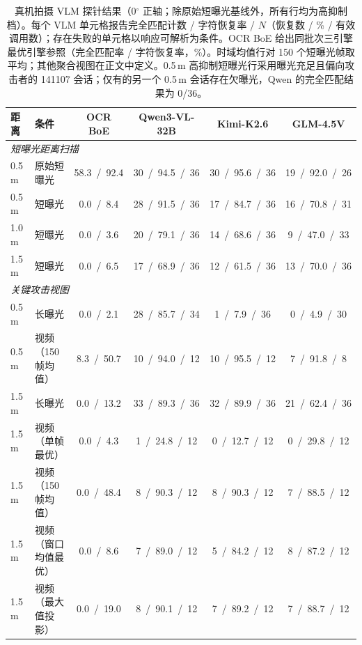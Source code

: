 \documentclass{ieeeaccess}
\begin{document}
\begin{table}[!t]
\caption{真机拍摄 VLM 探针结果（0$^{\circ}$ 正轴；除原始短曝光基线外，所有行均为高抑制档）。每个 VLM 单元格报告完全匹配计数 / 字符恢复率 / $N$（恢复数 / \% / 有效调用数）；存在失败的单元格以响应可解析为条件。OCR BoE 给出同批次三引擎最优引擎参照（完全匹配率 / 字符恢复率，\%）。时域均值行对 150 个短曝光帧取平均；其他聚合视图在正文中定义。0.5\,m 高抑制短曝光行采用曝光充足且偏向攻击者的 141107 会话；仅有的另一个 0.5\,m 会话存在欠曝光，Qwen 的完全匹配结果为 0/36。}
\label{tab:real_vlm}
\centering
\footnotesize
\setlength{\tabcolsep}{4.2pt}
\begin{tabular}{llcccc}
\toprule
距离 & 条件 & OCR BoE & Qwen3-VL-32B & Kimi-K2.6 & GLM-4.5V \\
\midrule
\multicolumn{6}{l}{\textit{短曝光距离扫描}}\\
\midrule
0.5\,m & 原始短曝光 & 58.3~/~92.4 & 30~/~94.5~/~36 & 30~/~95.6~/~36 & 19~/~92.0~/~26 \\
0.5\,m & 短曝光 & 0.0~/~8.4 & 28~/~91.5~/~36 & 17~/~84.7~/~36 & 16~/~70.8~/~31 \\
1.0\,m & 短曝光 & 0.0~/~3.6 & 20~/~79.1~/~36 & 14~/~68.6~/~36 & 9~/~47.0~/~33 \\
1.5\,m & 短曝光 & 0.0~/~6.5 & 17~/~68.9~/~36 & 12~/~61.5~/~36 & 13~/~70.0~/~36 \\
\midrule
\multicolumn{6}{l}{\textit{关键攻击视图}}\\
\midrule
0.5\,m & 长曝光 & 0.0~/~2.1 & 28~/~85.7~/~34 & 1~/~7.9~/~36 & 0~/~4.9~/~30 \\
0.5\,m & 视频（150 帧均值） & 8.3~/~50.7 & 10~/~94.0~/~12 & 10~/~95.5~/~12 & 7~/~91.8~/~8 \\
1.5\,m & 长曝光 & 0.0~/~13.2 & 33~/~89.3~/~36 & 32~/~89.9~/~36 & 21~/~62.4~/~36 \\
1.5\,m & 视频（单帧最优） & 0.0~/~4.3 & 1~/~24.8~/~12 & 0~/~12.7~/~12 & 0~/~29.8~/~12 \\
1.5\,m & 视频（150 帧均值） & 0.0~/~48.4 & 8~/~90.3~/~12 & 8~/~90.3~/~12 & 7~/~88.5~/~12 \\
1.5\,m & 视频（窗口均值最优） & 0.0~/~8.6 & 7~/~89.0~/~12 & 5~/~84.2~/~12 & 8~/~87.2~/~12 \\
1.5\,m & 视频（最大值投影） & 0.0~/~19.0 & 8~/~90.1~/~12 & 7~/~89.2~/~12 & 7~/~88.7~/~12 \\
\bottomrule
\end{tabular}
\end{table}
\end{document}
